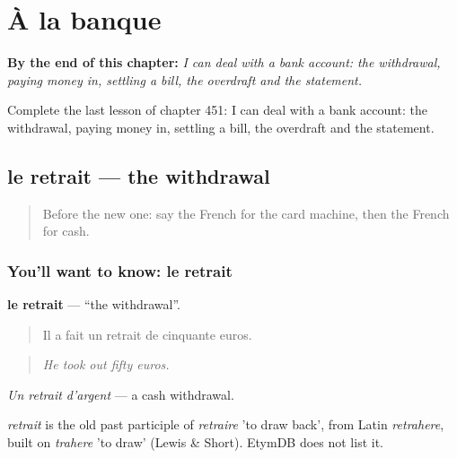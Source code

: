 
\chapter{À la banque}
\label{ch:fr-a-la-banque}

\begin{chapteropening}
\textbf{By the end of this chapter:} \emph{I can deal with a bank account: the withdrawal, paying money in, settling a bill, the overdraft and the statement.}

Complete the last lesson of chapter 451: I can deal with a bank account: the withdrawal, paying money in, settling a bill, the overdraft and the statement.
\end{chapteropening}

\section[le retrait]{le retrait — the withdrawal}

\label{lesson:FR-C451-retrait}



\begin{quote}
Before the new one: say the French for the card machine, then the French for cash.
\end{quote}

\subsection*{You'll want to know: le retrait}
\textbf{le retrait} — \textquotedblleft{}the withdrawal\textquotedblright{}.

\begin{quote}
Il a fait un retrait de cinquante euros.
\end{quote}

\begin{quote}
\emph{He took out fifty euros.}
\end{quote}

\emph{Un retrait d'argent} — a cash withdrawal.

\begin{cousinweb}
\emph{retrait} is the old past participle of \emph{retraire} 'to draw back', from Latin \emph{retrahere}, built on \emph{trahere} 'to draw' (Lewis \& Short). EtymDB does not list it.
\end{cousinweb}

